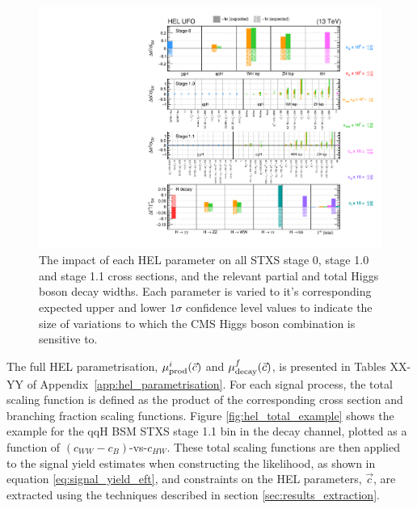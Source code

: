 \begin{figure}[htb!]
  \centering
  \hspace*{-1.4cm}
  \includegraphics[width=1.2\textwidth]{Figures/eft/scaling_functions/HEL_summary.pdf}
  \hspace*{-1.4cm}
  \caption[HEL summary]
  {
    The impact of each HEL parameter on all STXS stage 0, stage 1.0 and stage 1.1 cross sections, and the relevant partial and total Higgs boson decay widths. Each parameter is varied to it's corresponding expected upper and lower $1\sigma$ confidence level values to indicate the size of variations to which the CMS Higgs boson combination is sensitive to.
  }
  \label{fig:hel_summary}
\end{figure}

The full HEL parametrisation, $\mu_{\rm{prod}}^i(\vec{c})$ and $\mu_{\rm{decay}}^f(\vec{c})$, is presented in Tables XX-YY of Appendix~\ref{app:hel_parametrisation}. For each signal process, the total scaling function is defined as the product of the corresponding cross section and branching fraction scaling functions. Figure \ref{fig:hel_total_example} shows the example for the qqH BSM STXS stage 1.1 bin in the \Hfl decay channel, plotted as a function of $(c_{WW}-c_B)$-vs-$c_{HW}$. These total scaling functions are then applied to the signal yield estimates when constructing the likelihood, as shown in equation \ref{eq:signal_yield_eft}, and constraints on the HEL parameters, $\vec{c}$, are extracted using the techniques described in section \ref{sec:results_extraction}.


